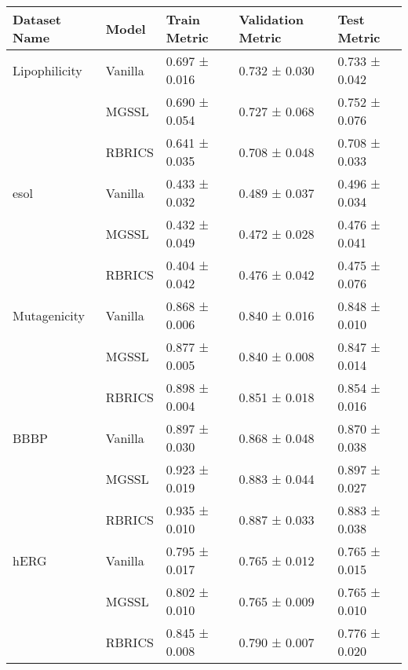 \begin{tabular}{|l|l|l|l|l|}
\toprule
Dataset Name & Model & Train Metric & Validation Metric & Test Metric \\
\midrule
Lipophilicity & Vanilla & 0.697 ± 0.016 & 0.732 ± 0.030 & 0.733 ± 0.042 \\
 & MGSSL & 0.690 ± 0.054 & 0.727 ± 0.068 & 0.752 ± 0.076 \\
 & RBRICS & 0.641 ± 0.035 & 0.708 ± 0.048 & 0.708 ± 0.033 \\
esol & Vanilla & 0.433 ± 0.032 & 0.489 ± 0.037 & 0.496 ± 0.034 \\
 & MGSSL & 0.432 ± 0.049 & 0.472 ± 0.028 & 0.476 ± 0.041 \\
 & RBRICS & 0.404 ± 0.042 & 0.476 ± 0.042 & 0.475 ± 0.076 \\
Mutagenicity & Vanilla & 0.868 ± 0.006 & 0.840 ± 0.016 & 0.848 ± 0.010 \\
 & MGSSL & 0.877 ± 0.005 & 0.840 ± 0.008 & 0.847 ± 0.014 \\
 & RBRICS & 0.898 ± 0.004 & 0.851 ± 0.018 & 0.854 ± 0.016 \\
BBBP & Vanilla & 0.897 ± 0.030 & 0.868 ± 0.048 & 0.870 ± 0.038 \\
 & MGSSL & 0.923 ± 0.019 & 0.883 ± 0.044 & 0.897 ± 0.027 \\
 & RBRICS & 0.935 ± 0.010 & 0.887 ± 0.033 & 0.883 ± 0.038 \\
hERG & Vanilla & 0.795 ± 0.017 & 0.765 ± 0.012 & 0.765 ± 0.015 \\
 & MGSSL & 0.802 ± 0.010 & 0.765 ± 0.009 & 0.765 ± 0.010 \\
 & RBRICS & 0.845 ± 0.008 & 0.790 ± 0.007 & 0.776 ± 0.020 \\
\bottomrule
\end{tabular}

